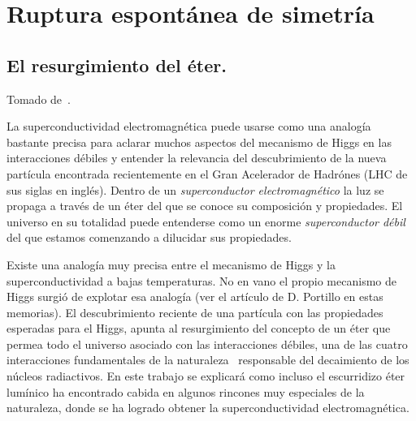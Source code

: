 \chapter{Ruptura espontánea de simetría}
\label{rupt-espont-de} %


\section{El resurgimiento del éter.}

Tomado de~\cite{restrepo2013resurgimiento}.


  La superconductividad electromagnética puede usarse como una analogía bastante precisa para aclarar muchos aspectos del mecanismo de Higgs en las interacciones débiles y  entender la relevancia del descubrimiento de la nueva partícula encontrada recientemente en el Gran Acelerador de Hadrónes (LHC de sus siglas en inglés).  Dentro de un \emph{superconductor electromagnético} la luz se propaga a través de un éter del que se conoce su composición y propiedades. El universo en su totalidad puede entenderse como un enorme \emph{superconductor débil} del que estamos comenzando a dilucidar sus propiedades.


Existe una analogía muy precisa entre el mecanismo de Higgs y la superconductividad a bajas temperaturas. No en vano el propio mecanismo de Higgs surgió de explotar esa analogía (ver el artículo de D. Portillo en estas memorias). El descubrimiento reciente de una partícula con las propiedades esperadas para el Higgs, apunta al resurgimiento del concepto de  un éter que permea todo el universo asociado con las interacciones débiles, una de las cuatro interacciones fundamentales de la naturaleza~\cite{pi} responsable del decaimiento de los núcleos radiactivos. En este trabajo se explicará como incluso el escurridizo éter lumínico ha encontrado cabida en algunos rincones muy especiales de la naturaleza, donde se ha logrado obtener la superconductividad electromagnética.   

